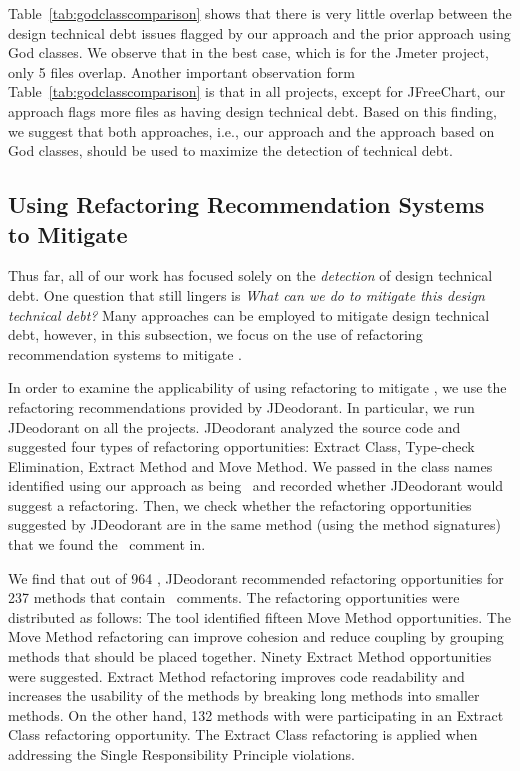 Table~\ref{tab:godclasscomparison} shows that there is very little overlap between the design technical debt issues flagged by our approach and the prior approach using God classes. We observe that in the best case, which is for the Jmeter project, only 5 files overlap. Another important observation form Table~\ref{tab:godclasscomparison} is that in all projects, except for JFreeChart, our approach flags more files as having design technical debt. Based on this finding, we suggest that both approaches, i.e., our approach and the approach based on God classes, should be used to maximize the detection of technical debt.

\subsection{Using Refactoring Recommendation Systems to Mitigate \SADTD}
Thus far, all of our work has focused solely on the \emph{detection} of design technical debt. One question that still lingers is \emph{What can we do to mitigate this design technical debt?}  Many approaches can be employed to mitigate design technical debt, however, in this subsection, we focus on the use of refactoring recommendation systems to mitigate \SADTD.

In order to examine the applicability of using refactoring to mitigate \SADTD, we use the refactoring recommendations provided by JDeodorant. In particular, we run JDeodorant on all the projects. JDeodorant analyzed the source code and suggested four types of  refactoring opportunities: Extract Class, Type-check Elimination, Extract Method and Move Method. We passed in the class names identified using our approach as being \SADTD~and recorded whether JDeodorant would suggest a refactoring. Then, we check whether the refactoring opportunities suggested by JDeodorant are in the same method (using the method signatures) that we found the \SADTD~comment in. 

We find that out of 964 \SADTD, JDeodorant recommended refactoring opportunities for 237 methods that contain \SADTD~comments. The refactoring opportunities were distributed as follows: The tool identified fifteen Move Method opportunities. The Move Method refactoring can improve cohesion and reduce coupling by grouping methods that should be placed together. Ninety Extract Method opportunities were suggested. Extract Method refactoring improves code readability and increases the usability of the methods by breaking long methods into smaller methods. On the other hand, 132 methods with \SADTD were participating in an Extract Class refactoring opportunity. The Extract Class refactoring is applied when addressing the Single Responsibility Principle violations.

